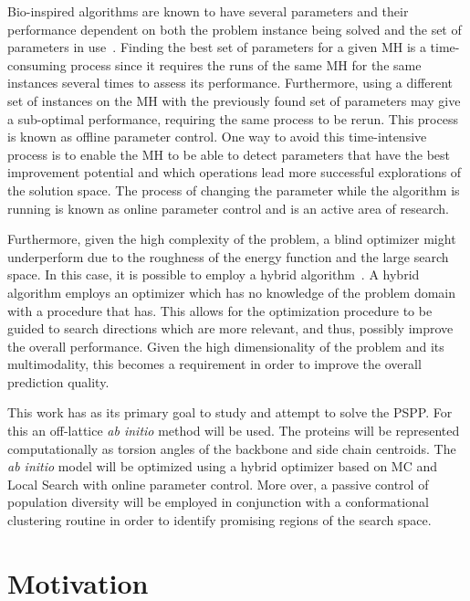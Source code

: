 Bio-inspired algorithms are known to have several parameters and their
performance dependent on both the problem instance being solved and the set of parameters in
use~\cite{parpinelli18review}.
Finding the best set of parameters for a given \ac{MH} is a time-consuming
process since it requires the runs of the same \ac{MH} for the same instances
several times to assess its performance. Furthermore, using a different set of
instances on the \ac{MH} with the previously found set of parameters may give a
sub-optimal performance, requiring the same process to be rerun.  This process
is known as offline parameter control. One way to avoid this time-intensive
process is to enable the \ac{MH} to be able to detect parameters that have the best
improvement potential and which operations lead more successful explorations of
the solution space. The process of changing the parameter while the algorithm
is running is known as online parameter control and is an active area of
research.

Furthermore, given the high complexity of the problem, a blind optimizer might
underperform due to the roughness of the energy function and the large
search space. In this case, it is possible to employ a hybrid
algorithm~\cite{blum2011hybrid}. A hybrid algorithm employs an optimizer which has no
knowledge of the problem domain with a procedure that has. This allows for the
optimization procedure to be guided to search directions which are more
relevant, and thus, possibly improve the overall performance. Given the
high dimensionality of the problem and its multimodality, this becomes a
requirement in order to improve the overall prediction quality.

This work has as its primary goal to study and attempt to solve the \ac{PSPP}. For this an
off-lattice \textit{ab initio} method will be used. The proteins will be
represented computationally as torsion angles of the backbone and side chain
centroids. The \textit{ab initio} model will be optimized using a hybrid
optimizer based on \ac{MC} and Local Search with online parameter control.
More over, a passive control of population diversity will be employed in
conjunction with a conformational clustering routine in order to identify
promising regions of the search space.


\section{Motivation}\label{sec:chap1_motivation}

